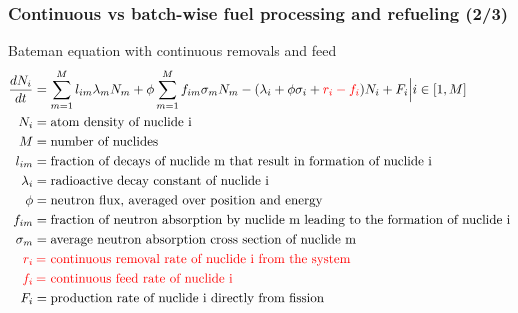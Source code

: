 \begin{frame}
\frametitle{Continuous vs batch-wise fuel processing  and refueling (2/3)}
\begin{block}{Bateman equation with continuous removals and feed}
	\hspace{-0.4in}
	\begin{align}
	\frac{dN_i}{dt} &= \sum_{m=1}^{M}l_{im}\lambda_mN_m + 
	\phi\sum_{m=1}^{M}f_{im}\sigma_mN_m - (\lambda_i + \phi\sigma_i + \textcolor{red}{r_i - 
	f_i})N_i + F_i\Big|{i\in [1,M]} \nonumber \\
	N_i &= \mbox{atom density of nuclide i} \nonumber \\
	M &= \mbox{number of nuclides} \nonumber \\
	l_{im} &= \mbox{fraction of decays of nuclide m that result in formation of 
		nuclide i}\nonumber \\
	\lambda_i &= \mbox{radioactive decay constant of nuclide i} \nonumber \\
	\phi &= \mbox{neutron flux, averaged over position and energy} \nonumber \\
	f_{im} &= \mbox{fraction of neutron absorption by nuclide m leading to the 
		formation of nuclide i} \nonumber \\
	\sigma_m &= \mbox{average neutron absorption cross section of nuclide m} 
	\nonumber \\
	\textcolor{red}{r_i} & \mkern4mu \textcolor{red}{=} \mbox{\space \textcolor{red}{continuous removal rate of nuclide i from the system}} \nonumber \\
	\textcolor{red}{f_i} & \mkern4mu  \textcolor{red}{=} \mbox{\space \textcolor{red}{continuous feed rate of nuclide i}} \nonumber \\
	F_i &= \mbox{production rate of nuclide i directly from fission}\nonumber
	\end{align}
\end{block}

\end{frame}

